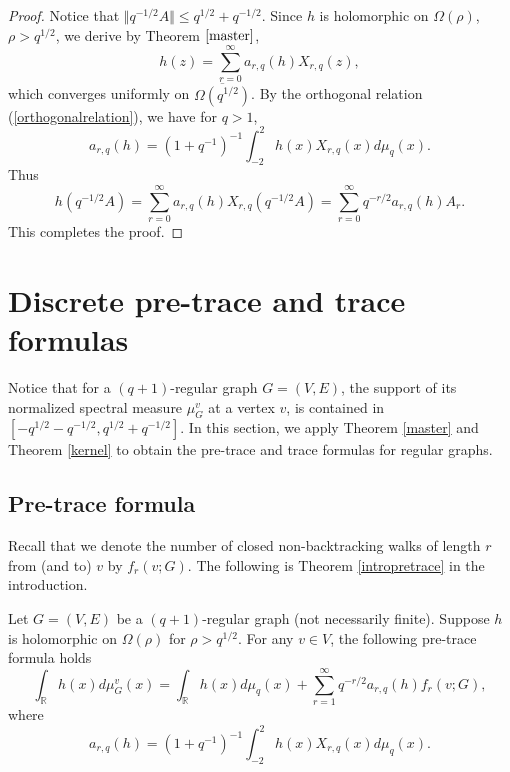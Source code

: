 \documentclass{article}
\begin{document}
\begin{proof}
    Notice that $\Vert q^{-1/2}A\Vert\leq q^{1/2}+q^{-1/2}$. Since $h$ is holomorphic on $\Omega(\rho)$, $\rho>q^{1/2}$, we derive by Theorem $\ref{master}$, \begin{equation*}
        h(z)=\sum_{r=0}^{\infty}a_{r,q}(h)X_{r,q}(z),
    \end{equation*}
    which converges uniformly on $\overline{\Omega(q^{1/2})}$. By the orthogonal relation (\ref{orthogonalrelation}), we have for $q>1$,
    \begin{equation*}
        a_{r,q}(h)=(1+q^{-1})^{-1}\int_{-2}^{2}h(x)X_{r,q}(x)d\mu_q(x).
    \end{equation*}
    Thus 
    \begin{equation*}
        h(q^{-1/2}A)=\sum_{r=0}^{\infty}a_{r,q}(h)X_{r,q}(q^{-1/2}A)=\sum_{r=0}^{\infty}q^{-r/2}a_{r,q}(h)A_r.
    \end{equation*}
    This completes the proof.
\end{proof}




\section{Discrete pre-trace and trace formulas}

Notice that for a $(q+1)$-regular graph $G=(V,E)$, the support of its normalized spectral measure $\mu_G^v$ at a vertex $v$, is contained in $[-q^{1/2}-q^{-1/2}, q^{1/2}+q^{-1/2}]$. In this section, we apply Theorem \ref{master} and Theorem \ref{kernel} to obtain the pre-trace and trace formulas for regular graphs. 

\subsection{Pre-trace formula}
Recall that we denote the number of closed non-backtracking walks of length $r$ from (and to) $v$ by $f_r(v;G)$. The following is Theorem \ref{intropretrace} in the introduction.
\begin{theorem}
    Let $G=(V,E)$ be a $(q+1)$-regular graph (not necessarily finite). Suppose 
    $h$ is holomorphic on $\Omega(\rho)$ for $\rho>q^{1/2}$. For any $v \in V$, the following pre-trace formula holds
    \begin{equation*}
\int_{\mathbb{R}} h(x) d\mu_{G}^{v}(x)=
\int_{\mathbb{R}} h(x) d\mu_q(x)+\sum_{r=1}^{\infty}q^{-r/2}a_{r,q}(h)f_r(v;G),
\end{equation*}
where $$a_{r,q}(h)=(1+q^{-1})^{-1}\int_{-2}^{2}h(x)X_{r,q}(x)d\mu_q(x).$$
\end{theorem}
\end{document}
